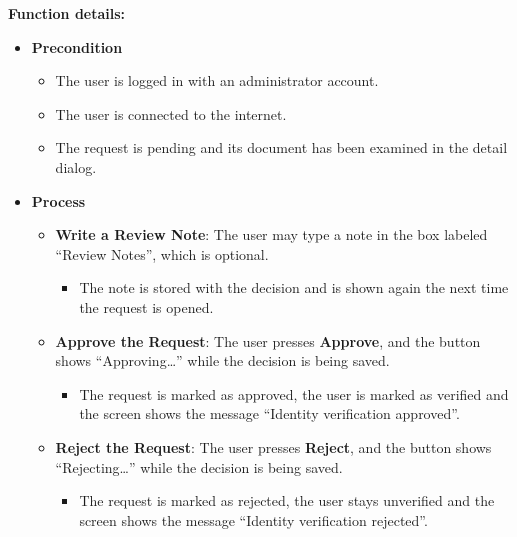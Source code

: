 \textbf{Function details:}
\begin{itemize}[leftmargin=1.6em,topsep=4pt,itemsep=3pt,parsep=0pt,label=$\bullet$]
    \item \textbf{Precondition}
        \begin{itemize}[leftmargin=2.2em,topsep=2pt,itemsep=3pt,parsep=0pt,label=$\circ$]
            \item The user is logged in with an administrator account.
            \item The user is connected to the internet.
            \item The request is pending and its document has been examined in the detail dialog.
        \end{itemize}
    \item \textbf{Process}
        \begin{itemize}[leftmargin=2.2em,topsep=2pt,itemsep=3pt,parsep=0pt,label=$\circ$]
            \item \textbf{Write a Review Note}: The user may type a note in the box labeled ``Review Notes'', which is optional.
                \begin{itemize}[leftmargin=2.2em,topsep=2pt,itemsep=3pt,parsep=0pt,label=$\blacksquare$]
                    \item The note is stored with the decision and is shown again the next time the request is opened.
                \end{itemize}
            \item \textbf{Approve the Request}: The user presses \textbf{Approve}, and the button shows ``Approving\dots'' while the decision is being saved.
                \begin{itemize}[leftmargin=2.2em,topsep=2pt,itemsep=3pt,parsep=0pt,label=$\blacksquare$]
                    \item The request is marked as approved, the user is marked as verified and the screen shows the message ``Identity verification approved''.
                \end{itemize}
            \item \textbf{Reject the Request}: The user presses \textbf{Reject}, and the button shows ``Rejecting\dots'' while the decision is being saved.
                \begin{itemize}[leftmargin=2.2em,topsep=2pt,itemsep=3pt,parsep=0pt,label=$\blacksquare$]
                    \item The request is marked as rejected, the user stays unverified and the screen shows the message ``Identity verification rejected''.

\end{itemize}
\end{itemize}
\end{itemize}
